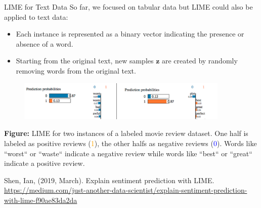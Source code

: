 \documentclass[11pt,compress,t,notes=noshow, xcolor=table]{beamer}
\newcommand{\zv}{\mathbf{z}}
\begin{document}
\begin{vbframe}{LIME for Text Data}
	So far, we focused on tabular data but LIME could also be applied to text data: 
	\begin{itemize}
		\item Each instance is represented as a binary vector indicating the presence or absence of a word.
		\item Starting from the original text, new samples $\zv$ are created by randomly removing words from the original text. 
	\end{itemize}
	
	\begin{figure}
		\begin{center}
			\includegraphics[width=0.9\textwidth]{figure/lime_movier}
		\end{center}
	\end{figure}
	
	
	\scriptsize{\textbf{Figure:} LIME for two instances of a labeled movie review dataset. One half is labeled as positive reviews (\textcolor{orange}{1}), 
		the other halfs as negative reviews (\textcolor{blue}{0}). Words like ``worst`` or ``waste`` indicate a negative review while words like ``best`` or ``great`` indicate a positive review.}
	
	\vspace{0.3cm}
	{\tiny{Shen, Ian, (2019, March). Explain sentiment prediction with LIME.
			\url{https://medium.com/just-another-data-scientist/explain-sentiment-prediction-with-lime-f90ae83da2da}}\par}
	
	\end{vbframe}
	
\end{document}
